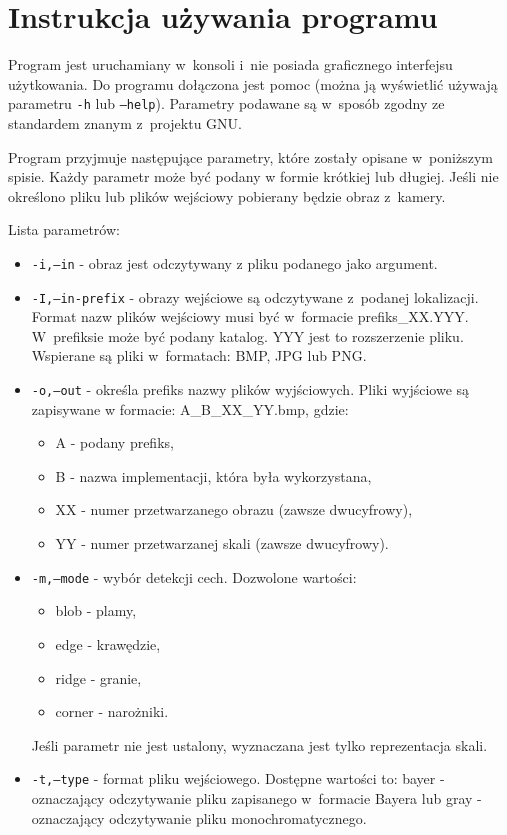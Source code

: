 \chapter{Instrukcja używania programu}
\label{cha:instrukcja}

Program jest uruchamiany w~konsoli i~nie posiada graficznego interfejsu użytkowania. Do programu dołączona jest pomoc (można ją wyświetlić używają parametru \texttt{-h} lub \texttt{--help}). Parametry podawane są w~sposób zgodny ze standardem znanym z~projektu GNU.

Program przyjmuje następujące parametry, które zostały opisane w~poniższym spisie. Każdy parametr może być podany w formie krótkiej lub długiej. Jeśli nie określono pliku lub plików wejściowy pobierany będzie obraz z~kamery.

Lista parametrów:
\begin{itemize}
\item \texttt{-i,--in} - obraz jest odczytywany z pliku podanego jako argument.
\item \texttt{-I,--in-prefix} - obrazy wejściowe są odczytywane z~podanej lokalizacji. Format nazw plików wejściowy musi być w~formacie prefiks\_XX.YYY. W~prefiksie może być podany katalog. YYY jest to rozszerzenie pliku. Wspierane są pliki w~formatach: BMP, JPG lub PNG.
\item \texttt{-o,--out} - określa prefiks nazwy plików wyjściowych. Pliki wyjściowe są zapisywane w formacie: A\_B\_XX\_YY.bmp, gdzie:
	\begin{itemize}
		\item A - podany prefiks,
		\item B - nazwa implementacji, która była wykorzystana,
		\item XX - numer przetwarzanego obrazu (zawsze dwucyfrowy),
		\item YY - numer przetwarzanej skali (zawsze dwucyfrowy).
	\end{itemize}
\item \texttt{-m,--mode} - wybór detekcji cech. Dozwolone wartości:
	\begin{itemize}
		\item blob - plamy,
		\item edge - krawędzie,
		\item ridge - granie,
		\item corner - narożniki.
	\end{itemize}
	Jeśli parametr nie jest ustalony, wyznaczana jest tylko reprezentacja skali.
\item \texttt{-t,--type} - format pliku wejściowego. Dostępne wartości to: bayer - oznaczający odczytywanie pliku zapisanego w~formacie Bayera lub gray - oznaczający odczytywanie pliku monochromatycznego.

\end{itemize}
